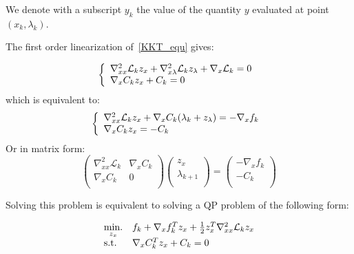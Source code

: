 We denote with a subscript $y_k$ the value of the quantity $y$ evaluated at point $(x_k, \lambda_k)$.

The first order linearization of~\ref{KKT_equ} gives:

\begin{equation}
  \label{KKT_1st_order}
  \left\{
\begin{array}{l}
  \nabla_{xx}^2\mathcal{L}_k z_x + \nabla_{x\lambda}^2\mathcal{L}_k z_\lambda + \nabla_x\mathcal{L}_k  = 0\\
  \nabla_x C_k z_x + C_k = 0\\
\end{array}
\right. \\
\end{equation}
which is equivalent to:
\begin{equation}
  \left\{
\begin{array}{l}
  \nabla_{xx}^2\mathcal{L}_k z_x + \nabla_{x}C_k (\lambda_k + z_\lambda) = - \nabla_{x}f_k\\
  \nabla_x C_k z_x = - C_k \\
\end{array}
\right. \\
\end{equation}
Or in matrix form:
\begin{equation}
  \begin{pmatrix}
      \nabla_{xx}^2\mathcal{L}_k & \nabla_x C_k\\
      \nabla_x C_k & 0\\
  \end{pmatrix}
  \begin{pmatrix}
      z_x\\
      \lambda_{k+1}\\
  \end{pmatrix}
  =
  \begin{pmatrix}
      -\nabla_{x}f_k\\
      -C_k\\
  \end{pmatrix}
\end{equation}

Solving this problem is equivalent to solving a QP problem of the following form:

\begin{equation}
  \begin{array}{ll}
    \operatorname*{min.}\limits_{z_x} &f_k + \nabla_x f_k ^T z_x + \frac{1}{2} z_x^T\nabla_{xx}^2\mathcal{L}_k z_x \\
    \text{s.t.} & \nabla_x C_k^T z_x + C_k = 0\\
  \end{array}
\end{equation}

